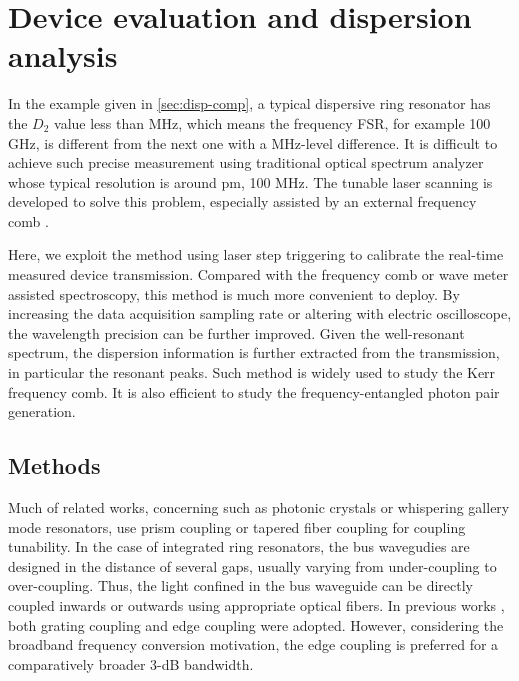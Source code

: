 
\chapter{Device evaluation and dispersion analysis}%


In the example given in \autoref{sec:disp-comp},  a typical dispersive ring resonator has the $ D_2 $ value less than MHz, which means the frequency FSR, for example 100 GHz, is different from the next one with a MHz-level difference. It is difficult to achieve such precise measurement using traditional optical spectrum analyzer whose typical resolution is around pm, 100 MHz. The tunable laser scanning is developed to solve this problem, especially assisted by an external frequency comb \cite{Liu2016d}. 

Here, we exploit the method using laser step triggering to calibrate the real-time measured device transmission. Compared with the frequency comb or wave meter assisted spectroscopy, this method is much more convenient to deploy. By increasing the data acquisition sampling rate or altering with electric oscilloscope, the wavelength precision can be further improved.
Given the well-resonant spectrum, the dispersion information is further extracted from the transmission, in particular the resonant peaks. Such method is widely used to study the Kerr frequency comb. It is also efficient to study the frequency-entangled photon pair generation.


\section{Methods}

Much of related works, concerning such as photonic crystals or whispering gallery mode resonators, use prism coupling or tapered fiber coupling for coupling tunability. 
In the case of integrated ring resonators, the bus wavegudies are designed in the distance of several gaps, usually varying from under-coupling to over-coupling. 
Thus, the light confined in the bus waveguide can be directly coupled inwards or outwards using appropriate optical fibers. 
In previous works \cite{Sunada2018}, both grating coupling and edge coupling were adopted. However, considering the broadband frequency conversion motivation, the edge coupling is preferred for a comparatively broader 3-dB bandwidth. 
 
